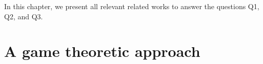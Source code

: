 In this chapter, we present all relevant related works to answer the questions Q1, Q2, and Q3. 

\section{A game theoretic approach }




